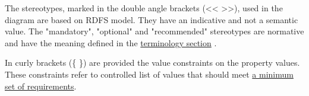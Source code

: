The stereotypes, marked in the double angle brackets
(\textless{}\textless{} \textgreater{}\textgreater{}), used in the
diagram are based on RDFS model. They have an indicative and not a
semantic value. The "mandatory", "optional" and "recommended"
stereotypes are normative and have the meaning defined in the
\href{ap-terminology.html\#ap-terminology}{terminology section} .

In curly brackets (\{ \}) are provided the value constraints on the
property values. These constraints refer to controlled list of values
that should meet \href{ap-controlled-vocabulary-requirements.html}{a
minimum set of requirements}.


